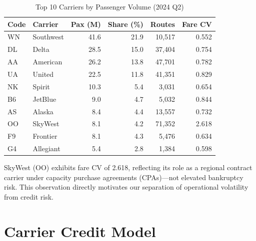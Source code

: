\documentclass[12pt,a4paper]{article}
\begin{document}
\begin{table}[H]
\centering
\caption{Top 10 Carriers by Passenger Volume (2024 Q2)}
\label{tab:carriers}
\begin{tabular}{llrrrr}
\toprule
\textbf{Code} & \textbf{Carrier} & \textbf{Pax (M)} & \textbf{Share (\%)} & \textbf{Routes} & \textbf{Fare CV} \\
\midrule
WN & Southwest  & 41.6 & 21.9 & 10,517 & 0.552 \\
DL & Delta      & 28.5 & 15.0 & 37,404 & 0.754 \\
AA & American   & 26.2 & 13.8 & 47,701 & 0.782 \\
UA & United     & 22.5 & 11.8 & 41,351 & 0.829 \\
NK & Spirit     & 10.3 &  5.4 &  3,031 & 0.654 \\
B6 & JetBlue    &  9.0 &  4.7 &  5,032 & 0.844\footnotemark[1] \\
AS & Alaska     &  8.4 &  4.4 & 13,557 & 0.732 \\
OO & SkyWest    &  8.1 &  4.2 & 71,352 & 2.618 \\
F9 & Frontier   &  8.1 &  4.3 &  5,476 & 0.634 \\
G4 & Allegiant  &  5.4 &  2.8 &  1,384\footnotemark[2] & 0.598 \\
\bottomrule
\end{tabular}
\end{table}

SkyWest (OO) exhibits fare CV of 2.618, reflecting its role as a regional contract carrier under capacity purchase agreements (CPAs)---not elevated bankruptcy risk. This observation directly motivates our separation of operational volatility from credit risk.

\section{Carrier Credit Model}
\end{document}
